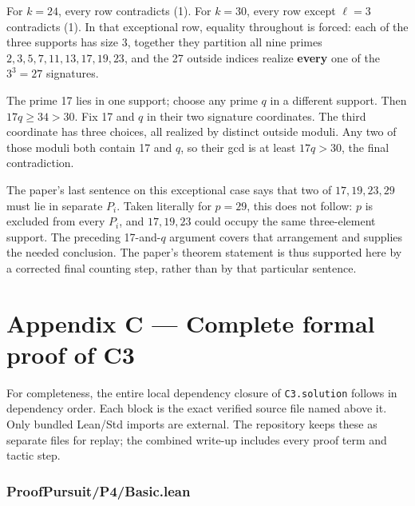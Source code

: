 \documentclass[11pt,a4paper]{article}
\begin{document}
For \(k=24\), every row contradicts (1). For \(k=30\), every row except \(\ell=3\) contradicts (1). In that exceptional row, equality throughout is forced: each of the three supports has size 3, together they partition all nine primes \(2,3,5,7,11,13,17,19,23\), and the 27 outside indices realize \textbf{every} one of the \(3^3=27\) signatures.

The prime 17 lies in one support; choose any prime \(q\) in a different support. Then \(17q\ge34>30\). Fix 17 and \(q\) in their two signature coordinates. The third coordinate has three choices, all realized by distinct outside moduli. Any two of those moduli both contain 17 and \(q\), so their gcd is at least \(17q>30\), the final contradiction.

The paper's last sentence on this exceptional case says that two of \(17,19,23,29\) must lie in separate \(P_i\). Taken literally for \(p=29\), this does not follow: \(p\) is excluded from every \(P_i\), and \(17,19,23\) could occupy the same three-element support. The preceding 17-and-\(q\) argument covers that arrangement and supplies the needed conclusion. The paper's theorem statement is thus supported here by a corrected final counting step, rather than by that particular sentence.

\section{Appendix C --- Complete formal proof of C3}\label{appendix-c-complete-formal-proof-of-c3}

For completeness, the entire local dependency closure of \texttt{C3.solution} follows in dependency order. Each block is the exact verified source file named above it. Only bundled Lean/Std imports are external. The repository keeps these as separate files for replay; the combined write-up includes every proof term and tactic step.

\subsubsection{ProofPursuit/P4/Basic.lean}\label{proofpursuitp4basic.lean}
\end{document}
